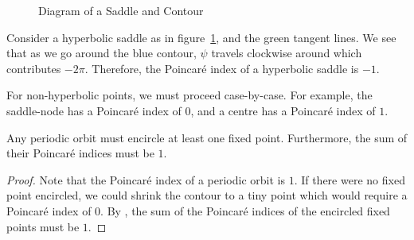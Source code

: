 \documentclass[../Main.tex]{subfiles}
\begin{document}
\begin{figure}
    \centering
    \caption{Diagram of a Saddle and Contour}
    \label{figSaddleAndContour}
\end{figure}
\begin{example}
    Consider a hyperbolic saddle as in figure~\ref{figSaddleAndContour}, and the green tangent lines. We see that as we go around the blue contour, $\psi$ travels clockwise around which contributes $-2\pi$. Therefore, the Poincaré index of a hyperbolic saddle is $-1$.
\end{example}
For non-hyperbolic points, we must proceed case-by-case. For example, the saddle-node has a Poincaré index of $0$, and a centre has a Poincaré index of $1$.
\begin{proposition}
    Any periodic orbit must encircle at least one fixed point. Furthermore, the sum of their Poincaré indices must be $1$.
    \label{propPeriodicHasFP}
\end{proposition}
\begin{proof}
    Note that the Poincaré index of a periodic orbit is $1$. If there were no fixed point encircled, we could shrink the contour to a tiny point which would require a Poincaré index of $0$. By , the sum of the Poincaré indices of the encircled fixed points must be $1$.
\end{proof}
\end{document}
